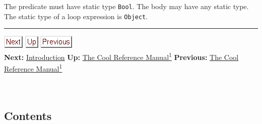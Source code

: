 \documentclass[]{article}
\begin{document}
The predicate must have static type \texttt{Bool}. The body may have any
static type. The static type of a loop expression is \texttt{Object}.

\begin{center}\rule{3in}{0.4pt}\end{center}

\href{node2.html}{\includegraphics{next.png}}
\href{cool-manual.html}{\includegraphics{up.png}}
\href{cool-manual.html}{\includegraphics{prev.png}} \\ \textbf{Next:}
\href{node2.html}{Introduction} \textbf{Up:} \href{cool-manual.html}{The
Cool Reference Manual\textsuperscript{1}} \textbf{Previous:}
\href{cool-manual.html}{The Cool Reference Manual\textsuperscript{1}} \\
\\ \\

\subsection{Contents}
\end{document}
